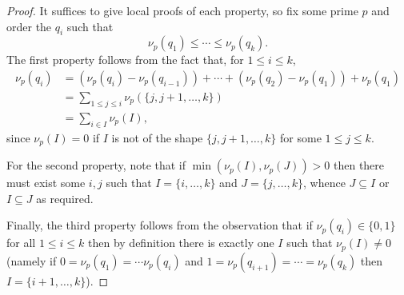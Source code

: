 \documentclass[11pt,letterpaper]{amsart}
\theoremstyle{definition}
\begin{document}
\begin{proof}
It suffices to give local proofs of each property, so fix some prime $p$ and order the $q_i$ such that 
\[\nu_p(q_1)\leq \cdots \leq \nu_p(q_k).\]
The first property follows from the fact that, for $1\leq i\leq k$,
\begin{align*}
\nu_p(q_i) 
&= (\nu_p(q_i)-\nu_p(q_{i-1}))+\cdots+(\nu_p(q_2)-\nu_p(q_1))+\nu_p(q_1)\\
&= \sum_{1\leq j\leq i} \nu_p(\{ j,j+1,\ldots,k\})\\
&=\sum_{i\in I}\nu_p(I),
\end{align*}
since $\nu_p(I)=0$ if $I$ is not of the shape $\{j,j+1,\ldots,k\}$ for some $1\leq j\leq k$. 

For the second property, note that if $\min(\nu_p(I),\nu_p(J))>0$ then there must exist some $i,j$ such that $I=\{i,\ldots,k\}$ and $J=\{j,\ldots,k\}$, whence $J\subseteq I$ or $I\subseteq J$ as required. 

Finally, the third property follows from the observation that if $\nu_p(q_i)\in \{0,1\}$ for all $1\leq i\leq k$ then by definition there is exactly one $I$ such that $\nu_p(I)\neq 0$ (namely if $0=\nu_p(q_1)=\cdots \nu_p(q_i)$ and $1=\nu_p(q_{i+1})=\cdots =\nu_p(q_k)$ then $I=\{i+1,\ldots,k\}$). 
\end{proof}
\end{document}
